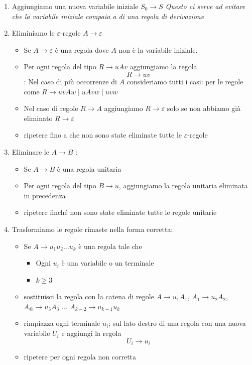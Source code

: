 \begin{enumerate}
	\item Aggiungiamo una nuova variabile iniziale $S_0\rightarrow S$ 
		\textit{Questo ci serve ad evitare che la variabile iniziale compaia a  di una regola di derivazione}
	\item Eliminiamo le $\varepsilon$-regole $A\rightarrow\varepsilon$ 
		\begin{itemize}
			\item Se $A\rightarrow\varepsilon$ è una regola dove $A$ non è la variabile iniziale. 
			\item Per ogni regola del tipo $R\rightarrow uAv$ aggiungiamo la regola $$R\rightarrow uv$$
				: Nel caso di più occorrenze di $A$ consideriamo tutti i casi: per le regole come 
			$R\rightarrow uvAw\mid uAvw\mid uvw$ 
			\item Nel caso di regole $R\rightarrow A$ aggiungiamo $R\rightarrow\varepsilon$ solo se non abbiamo già eliminato $R\rightarrow\varepsilon$ 
			\item ripetere fino a che non sono state eliminate tutte le $\varepsilon$-regole
		\end{itemize}

	\item  Eliminare le  $A\rightarrow B$ :
		\begin{itemize}
			\item  Se $A\rightarrow B$ è una regola unitaria 
			\item Per ogni regola del tipo $B\rightarrow u$, aggiungiamo la regola unitaria eliminata in precedenza
			\item ripetere finché non sono state eliminate tutte le regole unitarie
		\end{itemize}
	\item Trasformiamo le regole rimaste nella forma corretta: 
		\begin{itemize}
			\item Se $A\rightarrow u_1u_2\dots u_k$ è una regola tale che 
				\begin{itemize}
					\item Ogni $u_i$ è una variabile o un terminale 
					\item $k\geq 3$ 
				\end{itemize}
			\item sostituisci la regola con la catena di regole 
	  		$A\rightarrow u_1A_1$, $A_1\rightarrow u_2A_2$, $A_@\rightarrow u_3A_3$ $\dots$ $A_{k-2}\rightarrow u_{k-1}u_k$ 
			\item  rimpiazza ogni terminale $u_i$; sul lato destro di una regola con una nuova variabile
				$U_i$ e aggiungi la regola $$U_i\rightarrow u_i$$
			\item ripetere per ogni regola non corretta
		\end{itemize}
\end{enumerate}
